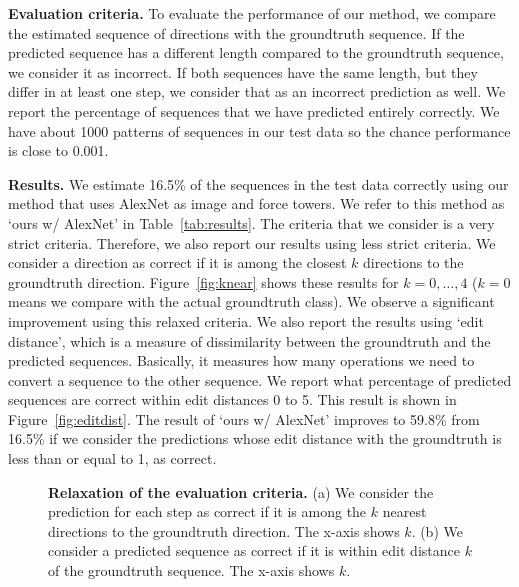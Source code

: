 \documentclass[runningheads]{llncs}
\begin{document}
\noindent \textbf{Evaluation criteria.}
To evaluate the performance of our method, we compare the estimated sequence of directions with the groundtruth sequence. If the predicted sequence has a different length compared to the groundtruth sequence, we consider it as incorrect. If both sequences have the same length, but they differ in at least one step, we consider that as an incorrect prediction as well. We report the percentage of sequences that we have predicted entirely correctly. We have about 1000 patterns of sequences in our test data so the chance performance is close to 0.001.


\noindent \textbf{Results.} We estimate 16.5\% of the sequences in the test data  correctly using our method that uses AlexNet as image and force towers. We refer to this method as `ours w/ AlexNet' in Table~\ref{tab:results}. The criteria that we consider is a very strict criteria. Therefore, we also report our results using less strict criteria. We consider a direction as correct if it is among the closest $k$ directions to the groundtruth direction. Figure~\ref{fig:knear} shows these results for $k=0,\ldots,4$ ($k=0$ means we compare with the actual groundtruth class). We observe a significant improvement using this relaxed criteria. We also report the results using `edit distance', which is a measure of dissimilarity between the groundtruth and the predicted sequences. Basically, it measures how many operations we need to convert a sequence to the other sequence. We report what percentage of predicted sequences are correct within edit distances 0 to 5. This result is shown in Figure~\ref{fig:editdist}. The result of `ours w/ AlexNet' improves to 59.8\% from 16.5\% if we consider the predictions whose edit distance with the groundtruth is less than or equal to 1, as correct. 



\begin{figure}[t]
\centering
{}
\caption{\textbf{Relaxation of the evaluation criteria.} (a) We consider the prediction for each step as correct if it is among the $k$ nearest directions to the groundtruth direction. The x-axis shows $k$. (b) We consider a predicted sequence as correct if it is within edit distance $k$ of the groundtruth sequence. The x-axis shows $k$.}
\label{fig:result}
\end{figure}
\end{document}
